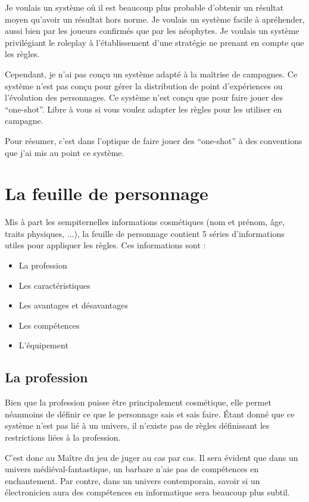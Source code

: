 \documentclass[oneside,12pt]{article}
\begin{document}
Je voulais un syst\`eme o\`u il est beaucoup plus probable d'obtenir un r\'esultat moyen qu'avoir un r\'esultat hors norme.
Je voulais un syst\`eme facile \`a apr\'ehender, aussi bien par les joueurs confirm\'es que par les n\'eophytes.
Je voulais un syst\`eme privil\'egiant le roleplay \`a l'\'etablissement d'une strat\'egie ne prenant en compte que les r\`egles.

Cependant, je n'ai pas con\c cu un syst\`eme adapt\'e \`a la ma\^itrise de campagnes.
Ce syst\`eme n'est pas con\c cu pour g\'erer la distribution de point d'exp\'eriences ou l'\'evolution des personnages.
Ce syst\`eme n'est con\c cu que pour faire jouer des ``one-shot''.
Libre \`a vous si vous voulez adapter les r\`egles pour les utiliser en campagne.

Pour r\'esumer, c'est dans l'optique de faire jouer des ``one-shot'' \`a des conventions que j'ai mis au point ce syst\`eme.
\newpage
\section{La feuille de personnage}
Mis \`a part les sempiternelles informations cosm\'etiques (nom et pr\'enom, \^age, traits physiques, ...), la feuille de personnage contient 5 s\'eries d'informations utiles pour appliquer les r\`egles.
Ces informations sont :
\begin{itemize}
\item
  La profession
\item
  Les caract\'eristiques
\item
  Les avantages et d\'esavantages
\item
  Les comp\'etences
\item
  L'\'equipement
\end{itemize}
\subsection{La profession}
Bien que la profession puisse \^etre principalement cosm\'etique, elle permet n\'eanmoins de d\'efinir ce que le personnage sais et sais faire.
\'Etant donn\'e que ce syst\`eme n'est pas li\'e \`a un univers, il n'existe pas de r\`egles d\'efinissant les restrictions li\'ees \`a la profession.

C'est donc au Ma\^itre du jeu de juger au cas par cas.
Il sera \'evident que dans un univers m\'edi\'eval-fantastique, un barbare n'aie pas de comp\'etences en enchantement.
Par contre, dans un univers contemporain, savoir si un \'electronicien aura des comp\'etences en informatique sera beaucoup plus subtil.
\end{document}
